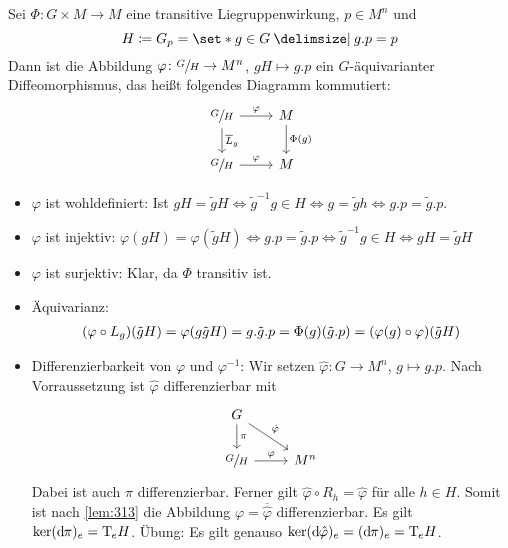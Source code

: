 \begin{lemma}[label=lem:316]
	Sei $\Phi \colon G \times M \to M$ eine transitive Liegruppenwirkung, $p \in M^n$ und 
	\[
		H \coloneqq G_p = \set*{g \in G \given g.p=p}
	\]
	Dann ist die Abbildung $\varphi \colon \sfrac{G}{H} \to M^n$, $gH \mapsto g.p$ ein $G$-äquivarianter Diffeomorphismus, das heißt folgendes Diagramm kommutiert:
	\[
		\begin{tikzcd}
			\sfrac{G}{H} \dar["\overline{L}_g"] \rar["\varphi"] & M \dar["\Phi(g)"] \\
			\sfrac{G}{H} \rar["\varphi"] & M
		\end{tikzcd}
	\]
\end{lemma}
\begin{beweis}
	\begin{itemize}
		\item $\varphi$ ist wohldefiniert: Ist $gH = \tilde{g}H \iff \tilde{g}^{-1}g \in H \iff g = \tilde{g}h \iff g.p = \tilde{g}.p$.
		\item $\varphi$ ist injektiv: $\varphi(gH) = \varphi(\tilde{g}H) \iff g.p = \tilde{g}.p \iff \tilde{g}^{-1}g \in H \iff gH = \tilde{g}H$
		\item $\varphi$ ist surjektiv: Klar, da $\Phi$ transitiv ist.
		\item Äquivarianz: 
		\begin{align}
			(\varphi \circ L_g)(\tilde{g}H) = \varphi \enbrace*{g \tilde{g}H} = g.\tilde{g}.p = \Phi(g) \enbrace*{\tilde{g}.p} = \enbrace*{\varphi(g) \circ \varphi}(\tilde{g}H)
		\end{align}
		\item Differenzierbarkeit von $\varphi$ und $\varphi^{-1}$:
		Wir setzen $\hat{\varphi} \colon G \to M^n$, $g \mapsto g.p$.
		Nach Vorraussetzung ist $\hat{\varphi}$ differenzierbar mit 
		\[
			\begin{tikzcd}
				G \drar["\hat{\varphi}"] \dar["\pi"] & \\
				\sfrac{G}{H} \rar["\varphi"] & M^n
			\end{tikzcd}
		\]
		Dabei ist auch $\pi$ differenzierbar.
		Ferner gilt $\hat{\varphi} \circ R_h = \hat{\varphi}$ für alle $h \in H$.
		Somit ist nach \autoref{lem:313} die Abbildung $\varphi = \overline{\hat{\varphi}}$ differenzierbar.
		Es gilt $\ker (\mathrm{d}\mkern-1.0mu \pi)_e = \mathrm{T}\mkern-0.85mu_e H$.
		Übung: Es gilt genauso $\ker (\mathrm{d}\mkern-1.0mu \hat{\varphi})_e = (\mathrm{d}\mkern-1.0mu \pi)_e = \mathrm{T}\mkern-0.85mu_e H$.
		

\end{itemize}
\end{beweis}
